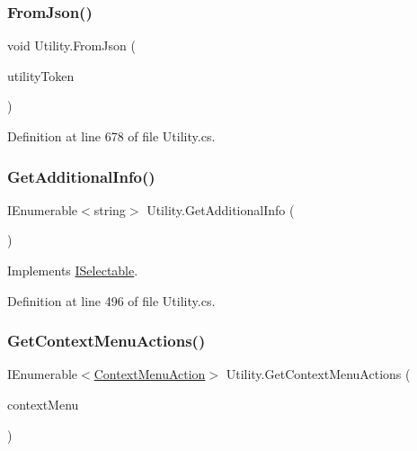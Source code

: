 \mbox{\label{class_utility_aaf08054a8528db9736f7d8dcdc78105e}} 
\subsubsection{\texorpdfstring{From\+Json()}{FromJson()}}
{\footnotesize\ttfamily void Utility.\+From\+Json (\begin{DoxyParamCaption}\item[{J\+Token}]{utility\+Token }\end{DoxyParamCaption})}



Definition at line 678 of file Utility.\+cs.

\mbox{\label{class_utility_a7b5e30bb3065f9edb004d385019d9c5b}} 
\subsubsection{\texorpdfstring{Get\+Additional\+Info()}{GetAdditionalInfo()}}
{\footnotesize\ttfamily I\+Enumerable$<$string$>$ Utility.\+Get\+Additional\+Info (\begin{DoxyParamCaption}{ }\end{DoxyParamCaption})}



Implements \hyperlink{interface_i_selectable_a337f81bfa99bb254bb2f7de6a8b5cd4b}{I\+Selectable}.



Definition at line 496 of file Utility.\+cs.

\mbox{\label{class_utility_a579c99983d713ac33be085976ef424df}} 
\subsubsection{\texorpdfstring{Get\+Context\+Menu\+Actions()}{GetContextMenuActions()}}
{\footnotesize\ttfamily I\+Enumerable$<$\hyperlink{class_context_menu_action}{Context\+Menu\+Action}$>$ Utility.\+Get\+Context\+Menu\+Actions (\begin{DoxyParamCaption}\item[{\hyperlink{class_context_menu}{Context\+Menu}}]{context\+Menu }\end{DoxyParamCaption})}



